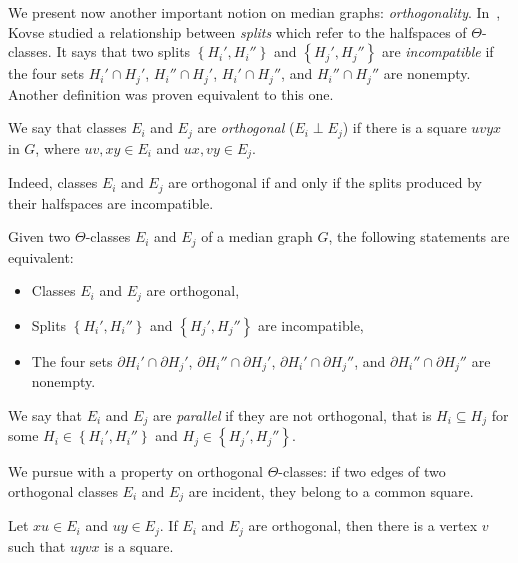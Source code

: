 \documentclass[a4paper,UKenglish,numberwithinsect,cleveref, autoref,anonymous]{lipics-v2021}
\newcommand{\set}[1]{\left\{ #1 \right\}}
\begin{document}
We present now another important notion on median graphs: \textit{orthogonality}. In~\cite{Ko09}, Kovse studied a relationship between \textit{splits} which refer to the halfspaces of $\Theta$-classes. It says that two splits $\set{H_i',H_i''}$ and $\set{H_j',H_j''}$ are \textit{incompatible} if the four sets $H_i' \cap H_j'$, $H_i'' \cap H_j'$, $H_i' \cap H_j''$, and $H_i'' \cap H_j''$ are nonempty. Another definition was proven equivalent to this one.

\begin{definition}
We say that classes $E_i$ and $E_j$ are {\em orthogonal} ($E_i \perp E_j$) if there is a square $uvyx$ in $G$, where $uv,xy \in E_i$ and $ux,vy \in E_j$.
\end{definition}

Indeed, classes $E_i$ and $E_j$ are orthogonal if and only if the splits produced by their halfspaces are incompatible.

\begin{lemma} Given two $\Theta$-classes $E_i$ and $E_j$ of a median graph $G$, the following statements are equivalent:
\begin{itemize}
    \item Classes $E_i$ and $E_j$ are orthogonal,
    \item Splits $\set{H_i',H_i''}$ and $\set{H_j',H_j''}$ are incompatible,
    \item The four sets $\partial H_i' \cap \partial H_j'$, $\partial H_i'' \cap \partial H_j'$, $\partial H_i' \cap \partial H_j''$, and $\partial H_i'' \cap \partial H_j''$ are nonempty.
\end{itemize}
\label{le:perp_incomp}
\end{lemma}

We say that $E_i$ and $E_j$ are \textit{parallel} if they are not orthogonal, that is $H_i \subseteq H_j$ for some $H_i \in \set{H_i',H_i''}$ and $H_j \in \set{H_j',H_j''}$. 

We pursue with a property on orthogonal $\Theta$-classes: if two edges of two orthogonal classes $E_i$ and $E_j$ are incident, they belong to a common square.

\begin{lemma}
Let $xu \in E_i$ and $uy \in E_j$. If $E_i$ and $E_j$ are orthogonal, then there is a vertex $v$ such that $uyvx$ is a square.
\label{le:squares}
\end{lemma}
\end{document}

